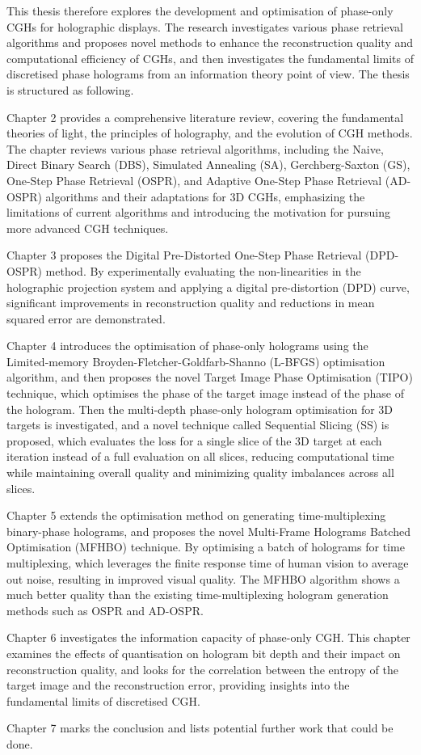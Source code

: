 This thesis therefore explores the development and optimisation of phase-only CGHs for holographic displays. The research investigates various phase retrieval algorithms and proposes novel methods to enhance the reconstruction quality and computational efficiency of CGHs, and then investigates the fundamental limits of discretised phase holograms from an information theory point of view. The thesis is structured as following.

Chapter 2 provides a comprehensive literature review, covering the fundamental theories of light, the principles of holography, and the evolution of CGH methods. The chapter reviews various phase retrieval algorithms, including the Naive, Direct Binary Search (DBS), Simulated Annealing (SA), Gerchberg-Saxton (GS), One-Step Phase Retrieval (OSPR), and Adaptive One-Step Phase Retrieval (AD-OSPR) algorithms and their adaptations for 3D CGHs, emphasizing the limitations of current algorithms and introducing the motivation for pursuing more advanced CGH techniques.

Chapter 3 proposes the Digital Pre-Distorted One-Step Phase Retrieval (DPD-OSPR) method. By experimentally evaluating the non-linearities in the holographic projection system and applying a digital pre-distortion (DPD) curve, significant improvements in reconstruction quality and reductions in mean squared error are demonstrated.

Chapter 4 introduces the optimisation of phase-only holograms using the Limited-memory Broyden-Fletcher-Goldfarb-Shanno (L-BFGS) optimisation algorithm, and then proposes the novel Target Image Phase Optimisation (TIPO) technique, which optimises the phase of the target image instead of the phase of the hologram. Then the multi-depth phase-only hologram optimisation for 3D targets is investigated, and a novel technique called Sequential Slicing (SS) is proposed, which evaluates the loss for a single slice of the 3D target at each iteration instead of a full evaluation on all slices, reducing computational time while maintaining overall quality and minimizing quality imbalances across all slices.

Chapter 5 extends the optimisation method on generating time-multiplexing binary-phase holograms, and proposes the novel Multi-Frame Holograms Batched Optimisation (MFHBO) technique. By optimising a batch of holograms for time multiplexing, which leverages the finite response time of human vision to average out noise, resulting in improved visual quality. The MFHBO algorithm shows a much better quality than the existing time-multiplexing hologram generation methods such as OSPR and AD-OSPR.

Chapter 6 investigates the information capacity of phase-only CGH. This chapter examines the effects of quantisation on hologram bit depth and their impact on reconstruction quality, and looks for the correlation between the entropy of the target image and the reconstruction error, providing insights into the fundamental limits of discretised CGH.

Chapter 7 marks the conclusion and lists potential further work that could be done.
